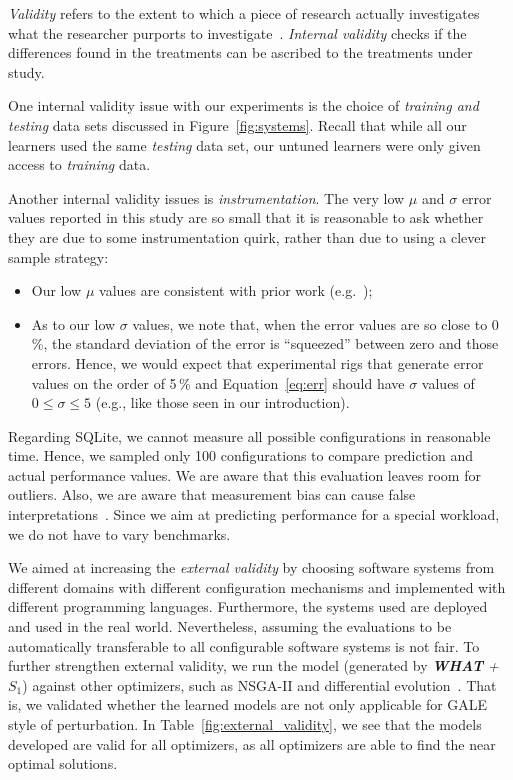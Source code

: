 \documentclass{newsig}
\newcommand{\fig}[1]{Figure~\ref{fig:#1}}
\newcommand{\eq}[1]{Equation~\ref{eq:#1}}
\newcommand{\what}{{\bf WHAT }}
\begin{document}
{\em Validity} refers to the extent to which a piece of research actually
investigates what the researcher purports to investigate~\cite{SSA15}.
{\em Internal validity} checks if the differences found in
the treatments can be ascribed to the treatments under study. 

One internal validity issue with our experiments is the choice
of {\em training and testing} data sets discussed in 
\fig{systems}. Recall that while all our learners used the same
{\em testing} data set, our untuned learners were only given
access to {\em training} data.

Another internal validity issues is {\em instrumentation}. The very low $\mu$ and $\sigma$ error values
reported in this study are so small that it is reasonable to ask whether they are due to some instrumentation
quirk, rather than due to using a clever sample strategy:
\begin{itemize}
\item
Our low $\mu$ values are consistent with prior work (e.g.~\cite{sarkar2015cost});
\item
As to our low $\sigma$ values, we note that, when the  error values are so close to 0\,\%, the standard
deviation of the error is ``squeezed'' between zero and those errors. Hence, we would expect that
experimental rigs
that generate error values on the order of 5\,\% and \eq{err} should have $\sigma$ values of $0\le \sigma \le 5$ (e.g., like those seen in our introduction).
\end{itemize}

Regarding SQLite, we cannot measure all possible configurations in reasonable time. Hence, we sampled only 100 configurations to compare prediction and actual performance values. We are aware that this evaluation leaves room for outliers.
Also, we are aware that measurement bias can cause false interpretations~\cite{me12d}. Since we aim at predicting performance for a special workload, we do not have to vary benchmarks.



  We aimed at increasing the {\em external validity} by choosing software systems from different domains with different configuration mechanisms and implemented with different programming languages. Furthermore, the systems used are deployed and used in the real world. Nevertheless, assuming the evaluations to be automatically transferable  to all configurable software systems is not fair. To further strengthen external validity, we run the model (generated by \textit{\what + $S_1$}) against other optimizers, such as NSGA-II and differential evolution~\cite{storn1997differential}. That is, we validated whether the learned models are not only applicable for GALE style of perturbation. In Table~\ref{fig:external_validity}, we see that the models developed are valid for all optimizers, as all optimizers are able to find the near optimal solutions.
\end{document}
